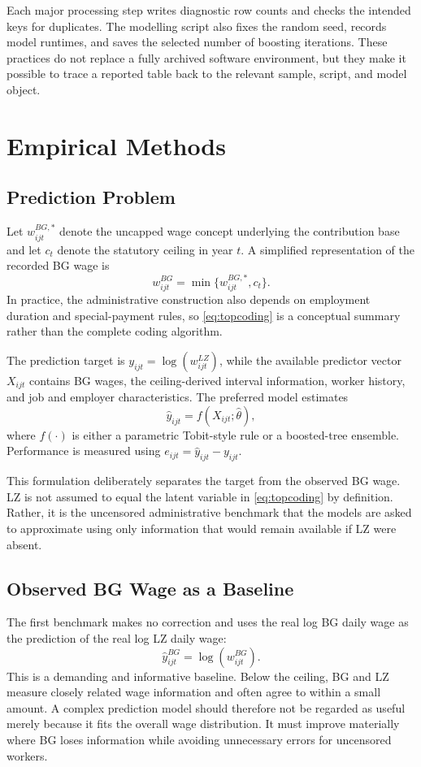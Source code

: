 \documentclass[12pt,a4paper,oneside,titlepage]{book}
\begin{document}
Each major processing step writes diagnostic row counts and checks the intended keys for duplicates. The modelling script also fixes the random seed, records model runtimes, and saves the selected number of boosting iterations. These practices do not replace a fully archived software environment, but they make it possible to trace a reported table back to the relevant sample, script, and model object.

\chapter{Empirical Methods}
\label{ch:methods}

\section{Prediction Problem}
Let $w^{BG,*}_{ijt}$ denote the uncapped wage concept underlying the contribution base and let $c_t$ denote the statutory ceiling in year $t$. A simplified representation of the recorded BG wage is
\begin{equation}
  w^{BG}_{ijt}=\min\{w^{BG,*}_{ijt},c_t\}.
  \label{eq:topcoding}
\end{equation}
In practice, the administrative construction also depends on employment duration and special-payment rules, so \cref{eq:topcoding} is a conceptual summary rather than the complete coding algorithm.

The prediction target is $y_{ijt}=\log(w^{LZ}_{ijt})$, while the available predictor vector $X_{ijt}$ contains BG wages, the ceiling-derived interval information, worker history, and job and employer characteristics. The preferred model estimates
\begin{equation}
  \widehat y_{ijt}=f(X_{ijt};\widehat\theta),
\end{equation}
where $f(\cdot)$ is either a parametric Tobit-style rule or a boosted-tree ensemble. Performance is measured using $e_{ijt}=\widehat y_{ijt}-y_{ijt}$.

This formulation deliberately separates the target from the observed BG wage. LZ is not assumed to equal the latent variable in \cref{eq:topcoding} by definition. Rather, it is the uncensored administrative benchmark that the models are asked to approximate using only information that would remain available if LZ were absent.

\section{Observed BG Wage as a Baseline}
The first benchmark makes no correction and uses the real log BG daily wage as the prediction of the real log LZ daily wage:
\begin{equation}
  \widehat y^{BG}_{ijt}=\log(w^{BG}_{ijt}).
\end{equation}
This is a demanding and informative baseline. Below the ceiling, BG and LZ measure closely related wage information and often agree to within a small amount. A complex prediction model should therefore not be regarded as useful merely because it fits the overall wage distribution. It must improve materially where BG loses information while avoiding unnecessary errors for uncensored workers.
\end{document}
